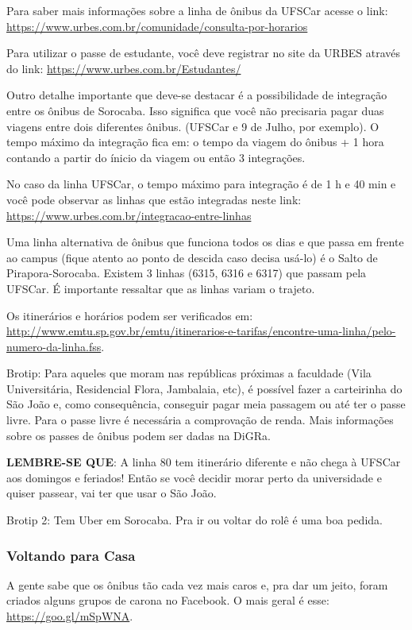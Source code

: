 Para saber mais informações sobre a linha de ônibus da UFSCar acesse o link: \newline \url{https://www.urbes.com.br/comunidade/consulta-por-horarios}

Para utilizar o passe de estudante, você deve registrar no site da URBES através do link: \url{https://www.urbes.com.br/Estudantes/}

Outro detalhe importante que deve-se destacar é a possibilidade de integração entre os ônibus de Sorocaba. Isso significa que você não precisaria pagar duas viagens entre dois diferentes ônibus. (UFSCar e 9 de Julho, por exemplo). O tempo máximo da integração fica em: o tempo da viagem do ônibus + 1 hora contando a partir do ínicio da viagem ou então 3 integrações.

No caso da linha UFSCar, o tempo máximo para integração é de 1 h e 40 min e você pode observar as linhas que estão integradas neste link: \newline \url{https://www.urbes.com.br/integracao-entre-linhas}

Uma linha alternativa de ônibus que funciona todos os dias e que passa em frente ao campus (fique atento ao ponto de descida caso decisa usá-lo) é o Salto de Pirapora-Sorocaba. Existem 3 linhas (6315, 6316 e 6317) que passam pela UFSCar. É importante ressaltar que as linhas variam o trajeto. 

Os itinerários e horários podem ser verificados em: \newline \url{http://www.emtu.sp.gov.br/emtu/itinerarios-e-tarifas/encontre-uma-linha/pelo-numero-da-linha.fss}.


Brotip: Para aqueles que moram nas repúblicas próximas a faculdade (Vila Universitária, Residencial Flora, Jambalaia, etc), é possível fazer a carteirinha do São João e, como consequência, conseguir pagar meia passagem ou até ter o passe livre. Para o passe livre é necessária a comprovação de renda. Mais informações sobre os passes de ônibus podem ser dadas na DiGRa.

\textbf{LEMBRE-SE QUE}: A linha 80 tem itinerário diferente e não chega à UFSCar aos domingos e feriados! Então se você decidir morar perto da universidade e quiser passear, vai ter que usar o São João.

Brotip 2: Tem Uber em Sorocaba. Pra ir ou voltar do rolê é uma boa pedida.

\subsubsection{Voltando para Casa}
A gente sabe que os ônibus tão cada vez mais caros e, pra dar um jeito, foram
criados alguns grupos de carona no Facebook. O mais geral é esse:
\newline \url{https://goo.gl/mSpWNA}.


